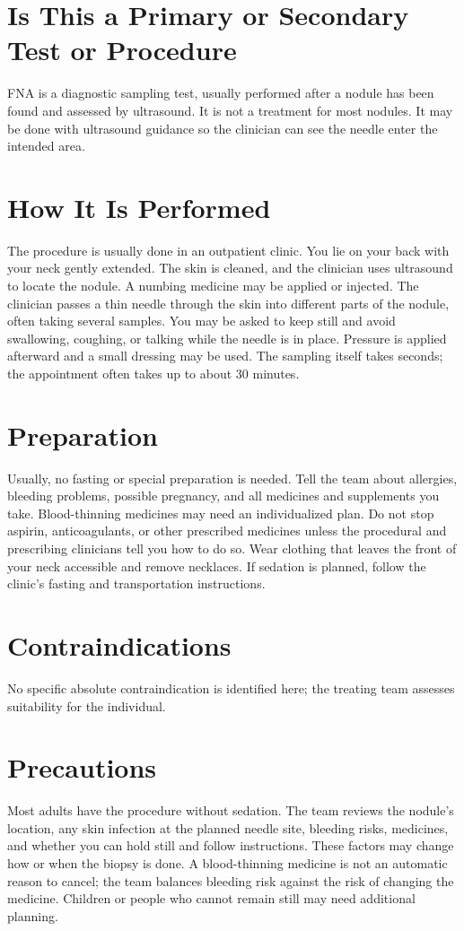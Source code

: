 \section*{Is This a Primary or Secondary Test or Procedure}
FNA is a diagnostic sampling test, usually performed after a nodule has been found and assessed by ultrasound. It is not a treatment for most nodules. It may be done with ultrasound guidance so the clinician can see the needle enter the intended area.

\section*{How It Is Performed}
The procedure is usually done in an outpatient clinic. You lie on your back with your neck gently extended. The skin is cleaned, and the clinician uses ultrasound to locate the nodule. A numbing medicine may be applied or injected. The clinician passes a thin needle through the skin into different parts of the nodule, often taking several samples. You may be asked to keep still and avoid swallowing, coughing, or talking while the needle is in place. Pressure is applied afterward and a small dressing may be used. The sampling itself takes seconds; the appointment often takes up to about 30 minutes.

\section*{Preparation}
Usually, no fasting or special preparation is needed. Tell the team about allergies, bleeding problems, possible pregnancy, and all medicines and supplements you take. Blood-thinning medicines may need an individualized plan. Do not stop aspirin, anticoagulants, or other prescribed medicines unless the procedural and prescribing clinicians tell you how to do so. Wear clothing that leaves the front of your neck accessible and remove necklaces. If sedation is planned, follow the clinic's fasting and transportation instructions.

\section*{Contraindications}
No specific absolute contraindication is identified here; the treating team assesses suitability for the individual.

\section*{Precautions}
Most adults have the procedure without sedation. The team reviews the nodule's location, any skin infection at the planned needle site, bleeding risks, medicines, and whether you can hold still and follow instructions. These factors may change how or when the biopsy is done. A blood-thinning medicine is not an automatic reason to cancel; the team balances bleeding risk against the risk of changing the medicine. Children or people who cannot remain still may need additional planning.


